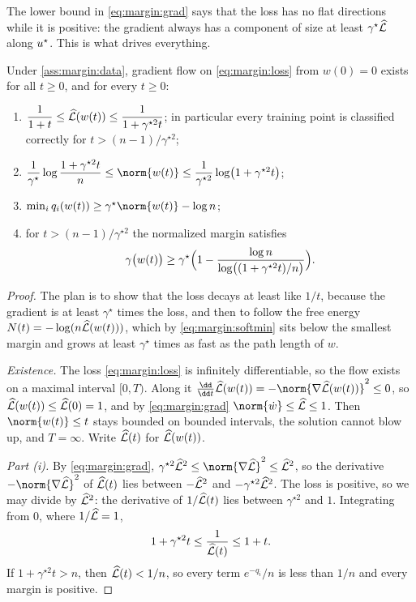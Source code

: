 \begin{refsection}
The lower bound in \eqref{eq:margin:grad} says that the loss has no flat directions while it is positive: the gradient always has a component of size at least $\gamma^\star\widehat{\mathcal{L}}$ along $u^\star$. This is what drives everything.

\begin{theorem}\label{thm:margin:main}
Under \cref{ass:margin:data}, gradient flow on \eqref{eq:margin:loss} from $w(0)=0$ exists for all $t\ge0$, and for every $t\ge0$:
\begin{enumerate}
\item $\dfrac1{1+t}\le\widehat{\mathcal{L}}(w(t))\le\dfrac1{1+\gamma^{\star2}t}$; in particular every training point is classified correctly for $t>(n-1)/\gamma^{\star2}$;
\item $\dfrac1{\gamma^\star}\log\dfrac{1+\gamma^{\star2}t}n\le\norm{w(t)}\le\dfrac1{\gamma^{\star2}}\log\bigl(1+\gamma^{\star2}t\bigr)$;
\item $\min_iq_i(w(t))\ge\gamma^\star\norm{w(t)}-\log n$;
\item for $t>(n-1)/\gamma^{\star2}$ the normalized margin satisfies
\begin{equation}\label{eq:margin:rate}
  \gamma\bigl(w(t)\bigr)\ge\gamma^\star\Bigl(1-\frac{\log n}{\log\bigl((1+\gamma^{\star2}t)/n\bigr)}\Bigr).
\end{equation}
\end{enumerate}
\end{theorem}

\begin{proof}
The plan is to show that the loss decays at least like $1/t$, because the gradient is at least $\gamma^\star$ times the loss, and then to follow the free energy $N(t)=-\log(n\widehat{\mathcal{L}}(w(t)))$, which by \eqref{eq:margin:softmin} sits below the smallest margin and grows at least $\gamma^\star$ times as fast as the path length of $w$.

\emph{Existence.} The loss \eqref{eq:margin:loss} is infinitely differentiable, so the flow exists on a maximal interval $[0,T)$. Along it $\frac{\dd}{\dd t}\Lhat(w(t))=-\norm{\nabla\Lhat(w(t))}^2\le0$, so $\widehat{\mathcal{L}}(w(t))\le\widehat{\mathcal{L}}(0)=1$, and by \eqref{eq:margin:grad} $\norm{\dot w}\le\Lhat\le1$. Then $\norm{w(t)}\le t$ stays bounded on bounded intervals, the solution cannot blow up, and $T=\infty$. Write $\widehat{\mathcal{L}}(t)$ for $\widehat{\mathcal{L}}(w(t))$.

\emph{Part (i).} By \eqref{eq:margin:grad}, $\gamma^{\star2}\Lhat^2\le\norm{\nabla\Lhat}^2\le\Lhat^2$, so the derivative $-\norm{\nabla\Lhat}^2$ of $\widehat{\mathcal{L}}(t)$ lies between $-\widehat{\mathcal{L}}^2$ and $-\gamma^{\star2}\widehat{\mathcal{L}}^2$. The loss is positive, so we may divide by $\widehat{\mathcal{L}}^2$: the derivative of $1/\widehat{\mathcal{L}}(t)$ lies between $\gamma^{\star2}$ and $1$. Integrating from $0$, where $1/\widehat{\mathcal{L}}=1$,
\[
  1+\gamma^{\star2}t\le\frac1{\widehat{\mathcal{L}}(t)}\le1+t .
\]
If $1+\gamma^{\star2}t>n$, then $\widehat{\mathcal{L}}(t)<1/n$, so every term $e^{-q_i}/n$ is less than $1/n$ and every margin is positive.


\end{proof}
\end{refsection}

